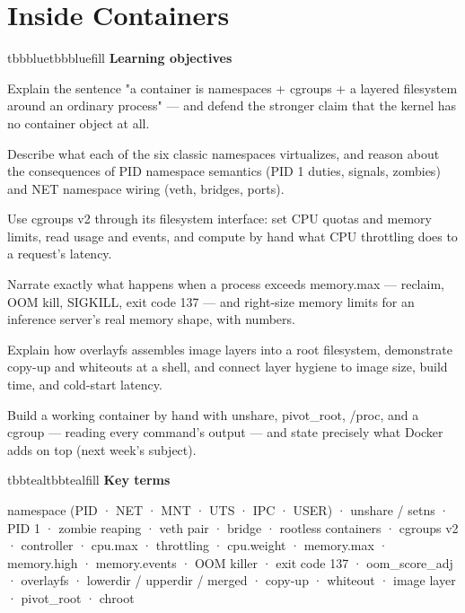 \setcounter{chapter}{2}
\chapter{Inside Containers}

\begin{calloutbox}{tbbblue}{tbbbluefill}
{\normalsize\bfseries\color{tbbblue}Learning objectives}\par\vspace{3pt}
\begin{tbbitemize}
  \item Explain the sentence "a container is namespaces + cgroups + a layered filesystem around an ordinary process" — and defend the stronger claim that the kernel has no container object at all.
  \item Describe what each of the six classic namespaces virtualizes, and reason about the consequences of PID namespace semantics (PID 1 duties, signals, zombies) and NET namespace wiring (veth, bridges, ports).
  \item Use cgroups v2 through its filesystem interface: set CPU quotas and memory limits, read usage and events, and compute by hand what CPU throttling does to a request's latency.
  \item Narrate exactly what happens when a process exceeds memory.max — reclaim, OOM kill, SIGKILL, exit code 137 — and right-size memory limits for an inference server's real memory shape, with numbers.
  \item Explain how overlayfs assembles image layers into a root filesystem, demonstrate copy-up and whiteouts at a shell, and connect layer hygiene to image size, build time, and cold-start latency.
  \item Build a working container by hand with unshare, pivot\_root, /proc, and a cgroup — reading every command's output — and state precisely what Docker adds on top (next week's subject).
\end{tbbitemize}
\end{calloutbox}

\vspace{5.0pt}

\begin{calloutbox}{tbbteal}{tbbtealfill}
{\normalsize\bfseries\color{tbbteal}Key terms}\par\vspace{3pt}
namespace (PID · NET · MNT · UTS · IPC · USER) · unshare / setns · PID 1 · zombie reaping · veth pair · bridge · rootless containers · cgroups v2 · controller · cpu.max · throttling · cpu.weight · memory.max · memory.high · memory.events · OOM killer · exit code 137 · oom\_score\_adj · overlayfs · lowerdir / upperdir / merged · copy-up · whiteout · image layer · pivot\_root · chroot
\end{calloutbox}

